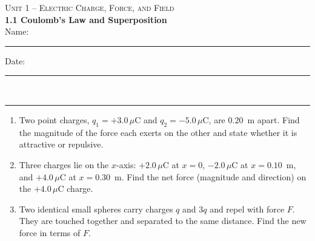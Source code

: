 \documentclass[11pt,letterpaper]{article}
\begin{document}
{\small\textsc{Unit 1 -- Electric Charge, Force, and Field}}\\[2pt]{\Large\bfseries 1.1 Coulomb's Law and Superposition}\\[8pt]Name: \rule{2.4in}{0.4pt} \hfill Date: \rule{1.4in}{0.4pt}\\[4pt]\hrule\vspace{10pt}{\small\itshape Placeholder worksheet for the site prototype. Free for classroom use.}\vspace{6pt}
\begin{enumerate}[leftmargin=*,itemsep=10pt]
\item Two point charges, $q_1 = +3.0\,\mu\text{C}$ and $q_2 = -5.0\,\mu\text{C}$, are $0.20$~m apart. Find the magnitude of the force each exerts on the other and state whether it is attractive or repulsive.
\vspace{2.2in}
\item Three charges lie on the $x$-axis: $+2.0\,\mu\text{C}$ at $x=0$, $-2.0\,\mu\text{C}$ at $x=0.10$~m, and $+4.0\,\mu\text{C}$ at $x=0.30$~m. Find the net force (magnitude and direction) on the $+4.0\,\mu\text{C}$ charge.
\vspace{2.2in}
\item Two identical small spheres carry charges $q$ and $3q$ and repel with force $F$. They are touched together and separated to the same distance. Find the new force in terms of $F$.
\vspace{2.2in}
\end{enumerate}
\end{document}
